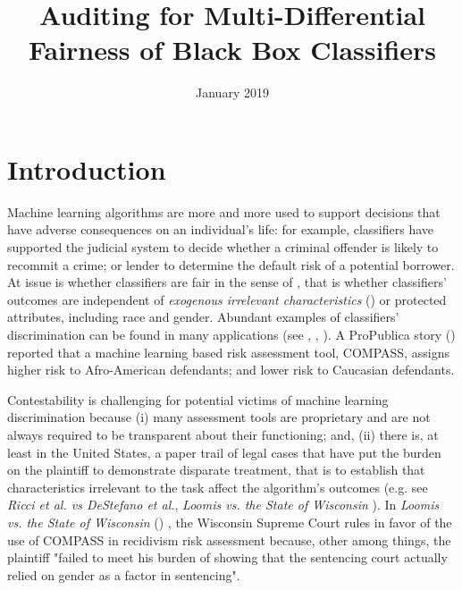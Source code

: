 \documentclass{article}
\title{Auditing for Multi-Differential Fairness of Black Box Classifiers}
\author{}
\date{January 2019}
\begin{document}
\maketitle
\section{Introduction}
Machine learning algorithms are more and more used to support decisions that have adverse consequences on an individual's life: for example, classifiers have supported the judicial system to decide whether a criminal offender is likely to recommit a crime; or lender to determine the default risk of a potential borrower. At issue is whether classifiers are fair in the sense of \cite{calsamiglia2009decentralizing} , that is whether classifiers' outcomes are independent of \textit{exogenous irrelevant characteristics} (\cite{calsamiglia2009decentralizing}) or protected attributes, including race and gender. Abundant examples of classifiers' discrimination can be found in many applications (see \cite{NY2017}, \cite{atlantic2016}, \cite{ProPublica2016}). A ProPublica story (\cite{ProPublica2016}) reported that a machine learning based risk assessment tool, COMPASS, assigns higher risk to Afro-American defendants; and lower risk to Caucasian defendants.

\bigskip
Contestability is challenging for potential victims of machine learning discrimination because (i) many assessment tools are proprietary and are not always required to be transparent about their functioning; and, (ii) there is, at least in the United States, a paper trail of legal cases that have put the burden on the plaintiff to demonstrate disparate treatment, that is to establish that characteristics irrelevant to the task affect the algorithm's outcomes (e.g. see \textit{Ricci et al. vs DeStefano et al.}\cite{Ricci}, \textit{Loomis vs. the State of Wisconsin} \cite{Loomis}). In  \textit{Loomis vs. the State of Wisconsin} (\cite{Loomis}) , the Wisconsin Supreme Court rules in favor of the use of COMPASS in recidivism risk assessment because, other among things, the plaintiff "failed to meet his burden of showing that the sentencing court actually relied on gender as a factor in sentencing". 
	
\end{document}
